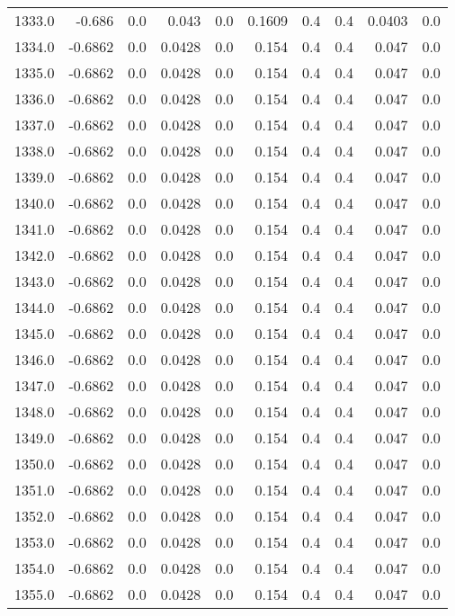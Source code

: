 \begin{longtable}{lrrrrrrrrr}
1333.0 & -0.686 & 0.0 & 0.043 & 0.0 & 0.1609 & 0.4 & 0.4 & 0.0403 & 0.0 \\
1334.0 & -0.6862 & 0.0 & 0.0428 & 0.0 & 0.154 & 0.4 & 0.4 & 0.047 & 0.0 \\
1335.0 & -0.6862 & 0.0 & 0.0428 & 0.0 & 0.154 & 0.4 & 0.4 & 0.047 & 0.0 \\
1336.0 & -0.6862 & 0.0 & 0.0428 & 0.0 & 0.154 & 0.4 & 0.4 & 0.047 & 0.0 \\
1337.0 & -0.6862 & 0.0 & 0.0428 & 0.0 & 0.154 & 0.4 & 0.4 & 0.047 & 0.0 \\
1338.0 & -0.6862 & 0.0 & 0.0428 & 0.0 & 0.154 & 0.4 & 0.4 & 0.047 & 0.0 \\
1339.0 & -0.6862 & 0.0 & 0.0428 & 0.0 & 0.154 & 0.4 & 0.4 & 0.047 & 0.0 \\
1340.0 & -0.6862 & 0.0 & 0.0428 & 0.0 & 0.154 & 0.4 & 0.4 & 0.047 & 0.0 \\
1341.0 & -0.6862 & 0.0 & 0.0428 & 0.0 & 0.154 & 0.4 & 0.4 & 0.047 & 0.0 \\
1342.0 & -0.6862 & 0.0 & 0.0428 & 0.0 & 0.154 & 0.4 & 0.4 & 0.047 & 0.0 \\
1343.0 & -0.6862 & 0.0 & 0.0428 & 0.0 & 0.154 & 0.4 & 0.4 & 0.047 & 0.0 \\
1344.0 & -0.6862 & 0.0 & 0.0428 & 0.0 & 0.154 & 0.4 & 0.4 & 0.047 & 0.0 \\
1345.0 & -0.6862 & 0.0 & 0.0428 & 0.0 & 0.154 & 0.4 & 0.4 & 0.047 & 0.0 \\
1346.0 & -0.6862 & 0.0 & 0.0428 & 0.0 & 0.154 & 0.4 & 0.4 & 0.047 & 0.0 \\
1347.0 & -0.6862 & 0.0 & 0.0428 & 0.0 & 0.154 & 0.4 & 0.4 & 0.047 & 0.0 \\
1348.0 & -0.6862 & 0.0 & 0.0428 & 0.0 & 0.154 & 0.4 & 0.4 & 0.047 & 0.0 \\
1349.0 & -0.6862 & 0.0 & 0.0428 & 0.0 & 0.154 & 0.4 & 0.4 & 0.047 & 0.0 \\
1350.0 & -0.6862 & 0.0 & 0.0428 & 0.0 & 0.154 & 0.4 & 0.4 & 0.047 & 0.0 \\
1351.0 & -0.6862 & 0.0 & 0.0428 & 0.0 & 0.154 & 0.4 & 0.4 & 0.047 & 0.0 \\
1352.0 & -0.6862 & 0.0 & 0.0428 & 0.0 & 0.154 & 0.4 & 0.4 & 0.047 & 0.0 \\
1353.0 & -0.6862 & 0.0 & 0.0428 & 0.0 & 0.154 & 0.4 & 0.4 & 0.047 & 0.0 \\
1354.0 & -0.6862 & 0.0 & 0.0428 & 0.0 & 0.154 & 0.4 & 0.4 & 0.047 & 0.0 \\
1355.0 & -0.6862 & 0.0 & 0.0428 & 0.0 & 0.154 & 0.4 & 0.4 & 0.047 & 0.0 \\

\end{longtable}
